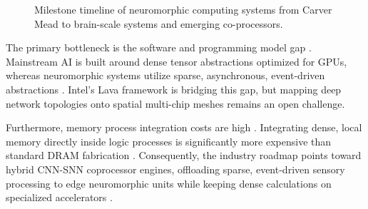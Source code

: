 \documentclass[11pt]{article}
\begin{document}
\begin{figure}[htbp]
    \centering
    \caption{Milestone timeline of neuromorphic computing systems from Carver Mead to brain-scale systems and emerging co-processors.}
    \label{fig:timeline}
\end{figure}

The primary bottleneck is the software and programming model gap \cite{schuman2017survey}. Mainstream AI is built around dense tensor abstractions optimized for GPUs, whereas neuromorphic systems utilize sparse, asynchronous, event-driven abstractions \cite{schuman2017survey}. Intel's Lava framework is bridging this gap, but mapping deep network topologies onto spatial multi-chip meshes remains an open challenge. 

Furthermore, memory process integration costs are high \cite{schuman2017survey}. Integrating dense, local memory directly inside logic processes is significantly more expensive than standard DRAM fabrication \cite{schuman2017survey}. Consequently, the industry roadmap points toward hybrid CNN-SNN coprocessor engines, offloading sparse, event-driven sensory processing to edge neuromorphic units while keeping dense calculations on specialized accelerators \cite{intel2024halapoint,schuman2017survey}.
\end{document}
